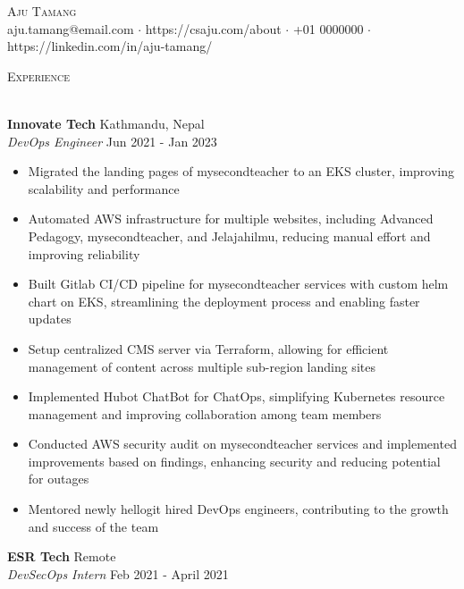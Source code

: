 \documentclass[a4paper]{article}
\newcommand{\lineunder} {
    \vspace*{-8pt} \\
    \hspace*{-18pt} \hrulefill \\
}
\newcommand{\header} [1] {
    {\hspace*{-18pt}\vspace*{6pt} \textsc{#1}}
    \vspace*{-6pt} \lineunder
}
\begin{document}
\vspace*{-40pt}

    

\vspace*{-10pt}
\begin{center}
	{\Huge \scshape {Aju Tamang}}\\
	aju.tamang@email.com $\cdot$ https://csaju.com/about $\cdot$ +01 0000000 $\cdot$ https://linkedin.com/in/aju-tamang/\\
\end{center}



\header{Experience}
\vspace{1mm}

\textbf{Innovate Tech} \hfill Kathmandu, Nepal\\
\textit{DevOps Engineer} \hfill Jun 2021 - Jan 2023\\
\vspace{-1mm}
\begin{itemize} \itemsep 1pt
	\item Migrated the landing pages of mysecondteacher to an EKS cluster, improving scalability and performance
	\item Automated AWS infrastructure for multiple websites, including Advanced Pedagogy, mysecondteacher, and Jelajahilmu, reducing manual effort and improving reliability
	\item Built Gitlab CI/CD pipeline for mysecondteacher services with custom helm chart on EKS, streamlining the deployment process and enabling faster updates
	\item Setup centralized CMS server via Terraform, allowing for efficient management of content across multiple sub-region landing sites
	\item Implemented Hubot ChatBot for ChatOps, simplifying Kubernetes resource management and improving collaboration among team members
	\item Conducted AWS security audit on mysecondteacher services and implemented improvements based on findings, enhancing security and reducing potential for outages
	\item Mentored newly hellogit  hired DevOps engineers, contributing to the growth and success of the team
\end{itemize}
\textbf{ESR Tech} \hfill Remote\\
\textit{DevSecOps Intern} \hfill Feb 2021 - April 2021\\
\vspace{-1mm}
\end{document}

